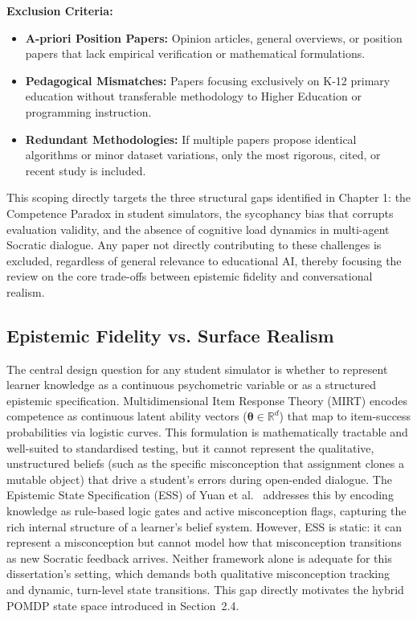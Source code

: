 \documentclass[11pt,a4paper]{report}
\begin{document}
\noindent\textbf{Exclusion Criteria:}
\begin{itemize}
    \item \textbf{A-priori Position Papers:} Opinion articles, general overviews, or position papers that lack empirical verification or mathematical formulations.
    \item \textbf{Pedagogical Mismatches:} Papers focusing exclusively on K-12 primary education without transferable methodology to Higher Education or programming instruction.
    \item \textbf{Redundant Methodologies:} If multiple papers propose identical algorithms or minor dataset variations, only the most rigorous, cited, or recent study is included.
\end{itemize}
This scoping directly targets the three structural gaps identified in Chapter 1: the Competence Paradox in student simulators, the sycophancy bias that corrupts evaluation validity, and the absence of cognitive load dynamics in multi-agent Socratic dialogue. Any paper not directly contributing to these challenges is excluded, regardless of general relevance to educational AI, thereby focusing the review on the core trade-offs between epistemic fidelity and conversational realism.

\subsection{Epistemic Fidelity vs. Surface Realism}
The central design question for any student simulator is whether to represent learner knowledge as a continuous psychometric variable or as a structured epistemic specification. Multidimensional Item Response Theory (MIRT) \cite{reckase2009multidimensional} encodes competence as continuous latent ability vectors ($\mathbf{\theta} \in \mathbb{R}^d$) that map to item-success probabilities via logistic curves. This formulation is mathematically tractable and well-suited to standardised testing, but it cannot represent the qualitative, unstructured beliefs (such as the specific misconception that assignment clones a mutable object) that drive a student's errors during open-ended dialogue. The Epistemic State Specification (ESS) of Yuan et al.\ \cite{yuan2026towards} addresses this by encoding knowledge as rule-based logic gates and active misconception flags, capturing the rich internal structure of a learner's belief system. However, ESS is static: it can represent a misconception but cannot model how that misconception transitions as new Socratic feedback arrives. Neither framework alone is adequate for this dissertation's setting, which demands both qualitative misconception tracking and dynamic, turn-level state transitions. This gap directly motivates the hybrid POMDP state space introduced in Section~2.4.
\end{document}
